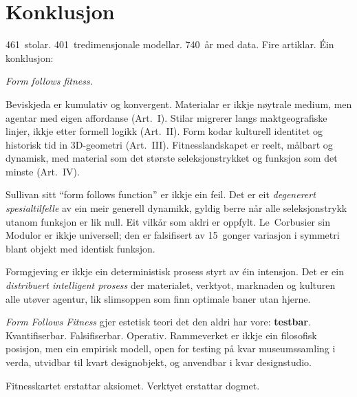 \documentclass[12pt,a4paper]{article}
\begin{document}
\section{Konklusjon}
\label{sec:konklusjon}

461~stolar. 401~tredimensjonale modellar. 740~\aa{}r med data. Fire artiklar. \'{E}in konklusjon:

\emph{Form follows fitness.}

Beviskjeda er kumulativ og konvergent. Materialar er ikkje n\o{}ytrale medium, men agentar med eigen affordanse (Art.~I). Stilar migrerer langs maktgeografiske linjer, ikkje etter formell logikk (Art.~II). Form kodar kulturell identitet og historisk tid in 3D-geometri (Art.~III). Fitnesslandskapet er reelt, m\aa{}lbart og dynamisk, med material som det st\o{}rste seleksjonstrykket og funksjon som det minste (Art.~IV).

Sullivan sitt \enquote{form follows function} er ikkje ein feil. Det er eit \emph{degenerert spesialtilfelle} av ein meir generell dynamikk, gyldig berre n\aa{}r alle seleksjonstrykk utanom funksjon er lik null. Eit vilk\aa{}r som aldri er oppfylt. Le~Corbusier sin Modulor er ikkje universell; den er falsifisert av 15~gonger variasjon i symmetri blant objekt med identisk funksjon.

Formgjeving er ikkje ein deterministisk prosess styrt av \'{e}in intensjon. Det er ein \emph{distribuert intelligent prosess} der materialet, verktyot, marknaden og kulturen alle ut\o{}ver agentur, lik slimsoppen som finn optimale baner utan hjerne.

\emph{Form Follows Fitness} gjer estetisk teori det den aldri har vore: \textbf{testbar}. Kvantifiserbar. Falsifiserbar. Operativ. Rammeverket er ikkje ein filosofisk posisjon, men ein empirisk modell, open for testing p\aa{} kvar museumssamling i verda, utvidbar til kvart designobjekt, og anvendbar i kvar designstudio.

Fitnesskartet erstattar aksiomet. Verktyet erstattar dogmet.



\end{document}
